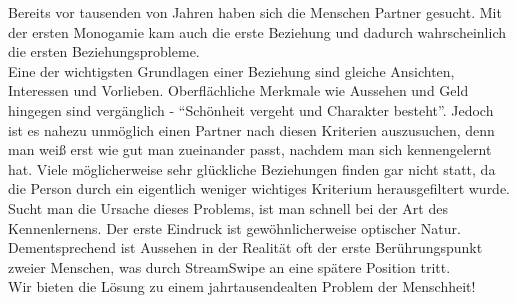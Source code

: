 
Bereits vor tausenden von Jahren haben sich die Menschen Partner gesucht.
Mit der ersten Monogamie kam auch die erste Beziehung und dadurch wahrscheinlich die ersten Beziehungsprobleme.\\
Eine der wichtigsten Grundlagen einer Beziehung sind gleiche Ansichten, Interessen und Vorlieben. 
Oberflächliche Merkmale wie Aussehen und Geld hingegen sind vergänglich - \enquote{Schönheit vergeht und Charakter besteht}. Jedoch ist es nahezu unmöglich einen Partner nach diesen Kriterien  auszusuchen, denn man weiß erst wie gut man zueinander passt, nachdem man sich kennengelernt hat. Viele möglicherweise sehr glückliche Beziehungen finden gar nicht statt, da die Person durch ein eigentlich weniger wichtiges Kriterium herausgefiltert wurde. Sucht man die Ursache dieses Problems, ist man schnell bei der Art des Kennenlernens. Der erste Eindruck ist gewöhnlicherweise optischer Natur. Dementsprechend ist Aussehen in der Realität oft der erste Berührungspunkt zweier Menschen, was durch StreamSwipe an eine spätere  Position tritt.\\
Wir bieten die Lösung zu einem jahrtausendealten Problem der Menschheit!

